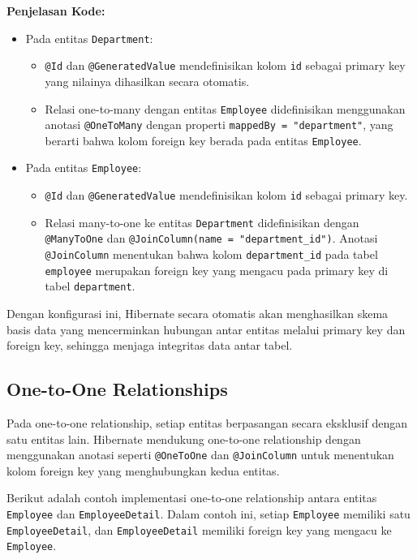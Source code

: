 \textbf{Penjelasan Kode:}
\begin{itemize}
	\item Pada entitas \texttt{Department}:
	\begin{itemize}
		\item \texttt{@Id} dan \texttt{@GeneratedValue} mendefinisikan kolom \texttt{id} sebagai primary key yang nilainya dihasilkan secara otomatis.
		\item Relasi one-to-many dengan entitas \texttt{Employee} didefinisikan menggunakan anotasi \texttt{@OneToMany} dengan properti \texttt{mappedBy = "department"}, yang berarti bahwa kolom foreign key berada pada entitas \texttt{Employee}.
	\end{itemize}
	\item Pada entitas \texttt{Employee}:
	\begin{itemize}
		\item \texttt{@Id} dan \texttt{@GeneratedValue} mendefinisikan kolom \texttt{id} sebagai primary key.
		\item Relasi many-to-one ke entitas \texttt{Department} didefinisikan dengan \texttt{@ManyToOne} dan \texttt{@JoinColumn(name = "department\_id")}. Anotasi \texttt{@JoinColumn} menentukan bahwa kolom \texttt{department\_id} pada tabel \texttt{employee} merupakan foreign key yang mengacu pada primary key di tabel \texttt{department}.
	\end{itemize}
\end{itemize}

Dengan konfigurasi ini, Hibernate secara otomatis akan menghasilkan skema basis data yang mencerminkan hubungan antar entitas melalui primary key dan foreign key, sehingga menjaga integritas data antar tabel.

\subsection{One-to-One Relationships}

Pada one-to-one relationship, setiap entitas berpasangan secara eksklusif dengan satu entitas lain. Hibernate mendukung one-to-one relationship dengan menggunakan anotasi seperti \texttt{@OneToOne} dan \texttt{@JoinColumn} untuk menentukan kolom foreign key yang menghubungkan kedua entitas.

Berikut adalah contoh implementasi one-to-one relationship antara entitas \texttt{Employee} dan \texttt{EmployeeDetail}. Dalam contoh ini, setiap \texttt{Employee} memiliki satu \texttt{EmployeeDetail}, dan \texttt{EmployeeDetail} memiliki foreign key yang mengacu ke \texttt{Employee}.

